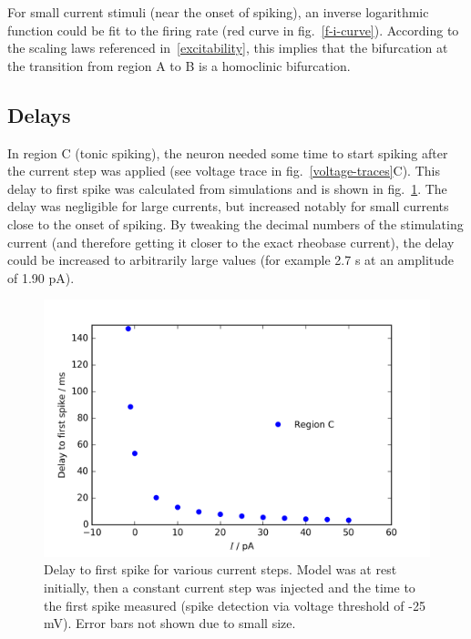 \documentclass[12pt,a4paper,]{report}
\begin{document}
For small current stimuli (near the onset of spiking), an inverse
logarithmic function could be fit to the firing rate (red curve in
fig.~\ref{f-i-curve}). According to the scaling laws referenced
in~\ref{excitability}, this implies that the bifurcation at the
transition from region A to B is a homoclinic bifurcation.

\subsection{Delays}\label{delays}

In region C (tonic spiking), the neuron needed some time to start
spiking after the current step was applied (see voltage trace in
fig.~\ref{voltage-traces}C). This delay to first spike was calculated
from simulations and is shown in fig.~\ref{plot-delays}. The delay was
negligible for large currents, but increased notably for small currents
close to the onset of spiking. By tweaking the decimal numbers of the
stimulating current (and therefore getting it closer to the exact
rheobase current), the delay could be increased to arbitrarily large
values (for example 2.7 s at an amplitude of 1.90 pA).

\begin{figure}
\centering
\includegraphics[]{images/delay.png}
\caption[Delay to first spike for various current steps]{Delay to first spike for various current steps. Model was
at rest initially, then a constant current step was injected and the
time to the first spike measured (spike detection via voltage threshold
of -25 mV). Error bars not shown due to small size.}\label{plot-delays}
\end{figure}
\end{document}
